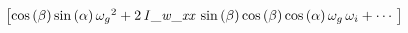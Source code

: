 \begin{equation*}
\begin{split}
\begin{bmatrix}
\cos \left( \beta \right) \sin \left( \alpha \right) {\omega_{g}}^{2}+
2\,{\it I\_w\_xx}\,\sin \left( \beta \right) \cos \left( \beta
 \right) \cos \left( \alpha \right) \omega_{g}\,\omega_{i}+\cdots\
\end{bmatrix}
\end{split}
\end{equation*}